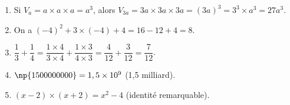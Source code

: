 \documentclass[10pt]{article}
\begin{document}
\begin{enumerate}
\item Si $V_a = a \times a \times a = a^3$, alors $V_{3a} =  3a \times 3a \times 3a = (3a)^3 = 3^3 \times a^3 = 27a^3$.
\item On a $(- 4)^2 + 3\times (- 4) + 4 = 16  - 12 + 4 = 8$.
\item $\dfrac{1}{3} + \dfrac{1}{4} = \dfrac{1\times 4}{3\times 4} + \dfrac{1\times 3}{4\times 3} = \dfrac{4}{12} + \dfrac{3}{12} = \dfrac{7}{12}$.
\item $\np{1500000000} = 1,5 \times 10^9$ (1,5 milliard).
\item $(x - 2)\times (x + 2) = x^2 - 4$ (identité remarquable).

\end{enumerate}

\bigskip
\end{document}

